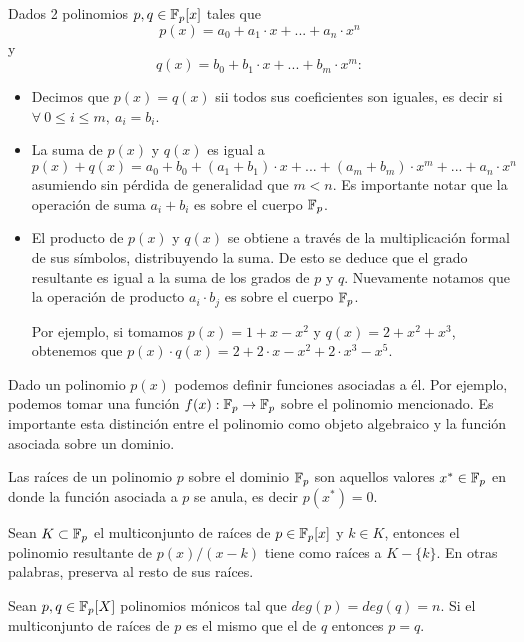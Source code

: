 \vspace{1em}

Dados 2 polinomios $p,q\in \mathbb{F}_p[x]$ tales que $$p(x) = a_0+a_1\cdot x + ... + a_n \cdot x^n$$ y $$q(x) = b_0+b_1\cdot x + ... + b_m \cdot x^m:$$
\begin{itemize}
    \item Decimos que $p(x)=q(x)$  sii todos sus coeficientes son iguales, es decir si $\forall~ 0\leq i \leq m, ~ a_i = b_i$. 
    \item La suma de $p(x)$ y $q(x)$ es igual a $$p(x)+q(x) = a_0 + b_0 + (a_1 + b_1)\cdot x +...+ (a_m+b_m)\cdot x^m + ... + a_n\cdot x^n$$ asumiendo sin pérdida de generalidad que $m<n$. Es importante notar que la operación de suma $a_i+b_i$ es sobre el cuerpo $\mathbb{F}_p$.
    \item El producto de $p(x)$ y $q(x)$ se obtiene a través de la multiplicación formal de sus símbolos, distribuyendo la suma. De esto se deduce que el grado resultante es igual a la suma de los grados de $p$ y $q$. Nuevamente notamos que la operación de producto $a_i \cdot b_j$ es sobre el cuerpo $\mathbb{F}_p$.
    
    Por ejemplo, si tomamos $p(x) = 1 + x - x^2$ y $q(x) = 2 + x^2 + x^3$, obtenemos que $p(x) \cdot q(x) = 2 + 2\cdot x - x^2 +2\cdot x^3 - x^5.$ 

\end{itemize}

Dado un polinomio $p(x)$ podemos definir funciones asociadas a él. Por ejemplo, podemos tomar una función $f(x): \mathbb{F}_p \rightarrow \mathbb{F}_p$ sobre el polinomio mencionado. Es importante esta distinción entre el polinomio como objeto algebraico y la función asociada sobre un dominio.

Las raíces de un polinomio $p$ sobre el dominio $\mathbb{F}_p$ son aquellos valores $x^* \in \mathbb{F}_p$ en donde la función asociada a $p$ se anula, es decir $p(x^*) = 0$.

\begin{prop} \label{prop:preserva_raices}
    Sean $K \subset \mathbb{F}_p$ el multiconjunto de raíces de $p \in \mathbb{F}_p[x]$ y $k\in K$, entonces el polinomio resultante de $p(x) / (x-k)$ tiene como raíces a $K -\{k\}$. En otras palabras, preserva al resto de sus raíces. 
\end{prop}

\begin{prop} \label{prop:unicidad_raices}
    Sean $p,q \in \mathbb{F}_p[X]$ polinomios mónicos tal que $deg(p) = deg(q) = n$. Si el multiconjunto de raíces de $p$ es el mismo que el de $q$ entonces $p=q$.
\end{prop}


